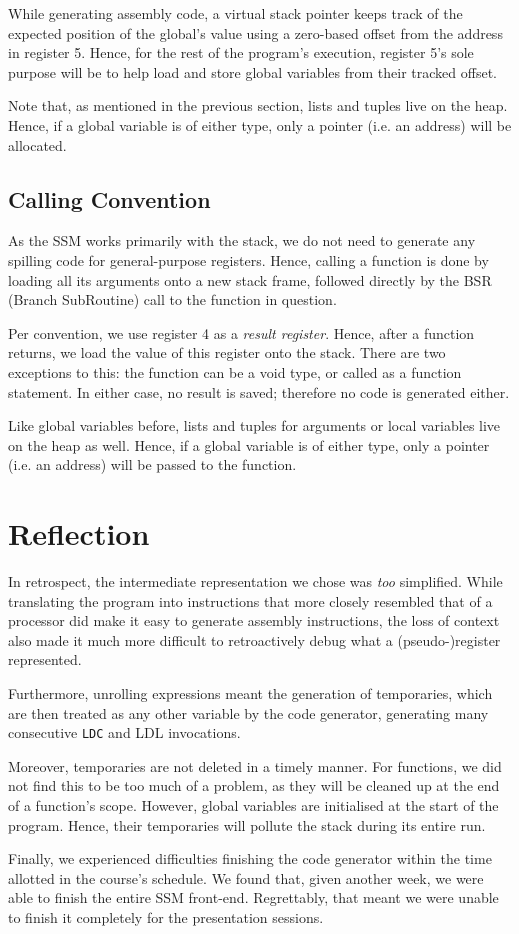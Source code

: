 While generating assembly code, a virtual stack pointer keeps track of the expected position of the global's value using a zero-based offset from the address in register 5.
Hence, for the rest of the program's execution, register 5's sole purpose will be to help load and store global variables from their tracked offset.

Note that, as mentioned in the previous section, lists and tuples live on the heap.
Hence, if a global variable is of either type, only a pointer (i.e. an address) will be allocated.


\subsection{Calling Convention}

As the SSM works primarily with the stack, we do not need to generate any spilling code for general-purpose registers.
Hence, calling a function is done by loading all its arguments onto a new stack frame, followed directly by the BSR (Branch SubRoutine) call to the function in question.

Per convention, we use register 4 as a \emph{result register}.
Hence, after a function returns, we load the value of this register onto the stack.
There are two exceptions to this: the function can be a void type, or called as a function statement.
In either case, no result is saved; therefore no code is generated either.

Like global variables before, lists and tuples for arguments or local variables live on the heap as well.
Hence, if a global variable is of either type, only a pointer (i.e. an address) will be passed to the function.


\section{Reflection}

In retrospect, the intermediate representation we chose was \emph{too} simplified.
While translating the program into instructions that more closely resembled that of a processor did make it easy to generate assembly instructions, the loss of context also made it much more difficult to retroactively debug what a (pseudo-)register represented.

Furthermore, unrolling expressions meant the generation of temporaries, which are then treated as any other variable by the code generator, generating many consecutive \texttt{LDC} and {LDL} invocations.

Moreover, temporaries are not deleted in a timely manner.
For functions, we did not find this to be too much of a problem, as they will be cleaned up at the end of a function's scope.
However, global variables are initialised at the start of the program.
Hence, their temporaries will pollute the stack during its entire run.

Finally, we experienced difficulties finishing the code generator within the time allotted in the course's schedule.
We found that, given another week, we were able to finish the entire SSM front-end.
Regrettably, that meant we were unable to finish it completely for the presentation sessions.
